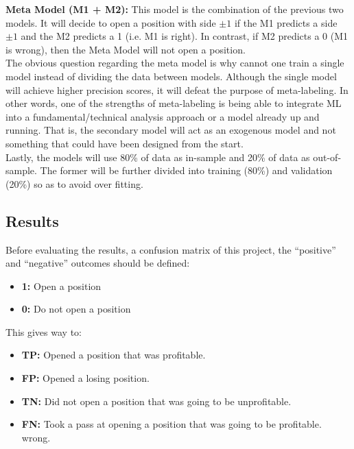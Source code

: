 \documentclass[a4paper]{article}
\begin{document}
\vspace{.1cm}
\noindent
\textbf{Meta Model (M1 + M2):} This model is the combination of the 
previous two models. It will decide to open a position with side 
$\pm 1$ if the M1 predicts a side $\pm 1$ and the M2 predicts a 1 
(i.e. M1 is right). In contrast, if M2 predicts a 0 (M1 is wrong), 
then the Meta Model will not open a position.\\

The obvious question regarding the meta model is why cannot one train 
a single model instead of dividing the data between models. Although 
the single model will achieve higher precision scores, it will defeat 
the purpose of meta-labeling. In other words, one of the strengths of 
meta-labeling is being able to integrate ML into a 
fundamental/technical analysis approach or a model already up and 
running. That is, the secondary model will act as an exogenous model 
and not something that could have been designed from the start.\\

Lastly, the models will use 80\% of data as in-sample and 20\% of data 
as out-of-sample. The former will be further divided into training 
(80\%) and validation (20\%) so as to avoid over fitting.

\subsection{Results}
Before evaluating the results, a confusion matrix of this project, the 
``positive'' and ``negative'' outcomes should be defined:

\begin{itemize}
	\item \textbf{1:} Open a position
	\item \textbf{0:} Do not open a position
\end{itemize}

This gives way to:

\begin{itemize}
	\item \textbf{TP:} Opened a position that was profitable. 
	\item \textbf{FP:} Opened a losing position.
	\item \textbf{TN:} Did not open a position that was going to be 
	unprofitable.
	\item \textbf{FN:} Took a pass at opening a position that was 
	going to be profitable. 
	wrong.
\end{itemize}
\end{document}
